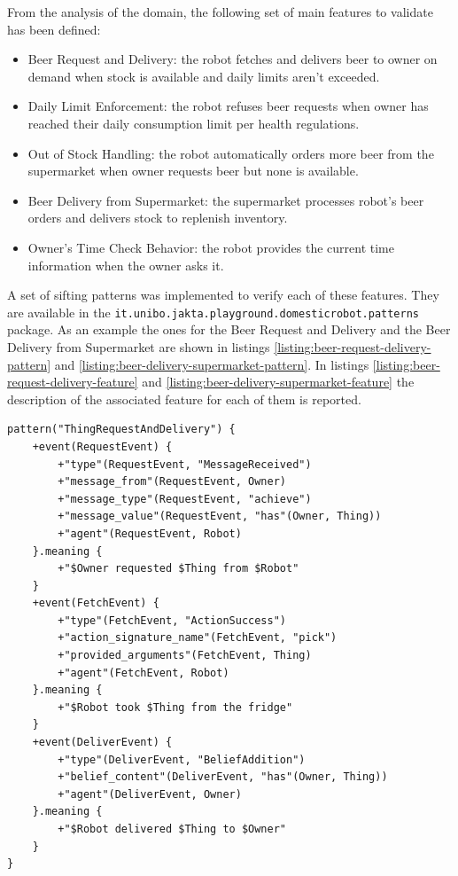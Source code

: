\documentclass{scrartcl}
\begin{document}
From the analysis of the domain, the following set of main features to validate has been defined:

\begin{itemize}
    \item Beer Request and Delivery: the robot fetches and delivers beer to owner on demand when stock is available and daily limits aren't exceeded.
    \item Daily Limit Enforcement: the robot refuses beer requests when owner has reached their daily consumption limit per health regulations.
    \item Out of Stock Handling: the robot automatically orders more beer from the supermarket when owner requests beer but none is available.
    \item Beer Delivery from Supermarket: the supermarket processes robot's beer orders and delivers stock to replenish inventory.
    \item Owner's Time Check Behavior: the robot provides the current time information when the owner asks it.
\end{itemize}

A set of sifting patterns was implemented to verify each of these features. They are available in the \verb|it.unibo.jakta.playground.domesticrobot.patterns| package. As an example the ones for the Beer Request and Delivery and the Beer Delivery from Supermarket are shown in listings \ref{listing:beer-request-delivery-pattern} and \ref{listing:beer-delivery-supermarket-pattern}. In listings \ref{listing:beer-request-delivery-feature} and \ref{listing:beer-delivery-supermarket-feature} the description of the associated feature for each of them is reported.

\begin{listing}
\begin{verbatim}
pattern("ThingRequestAndDelivery") {
    +event(RequestEvent) {
        +"type"(RequestEvent, "MessageReceived")
        +"message_from"(RequestEvent, Owner)
        +"message_type"(RequestEvent, "achieve")
        +"message_value"(RequestEvent, "has"(Owner, Thing))
        +"agent"(RequestEvent, Robot)
    }.meaning {
        +"$Owner requested $Thing from $Robot"
    }
    +event(FetchEvent) {
        +"type"(FetchEvent, "ActionSuccess")
        +"action_signature_name"(FetchEvent, "pick")
        +"provided_arguments"(FetchEvent, Thing)
        +"agent"(FetchEvent, Robot)
    }.meaning {
        +"$Robot took $Thing from the fridge"
    }
    +event(DeliverEvent) {
        +"type"(DeliverEvent, "BeliefAddition")
        +"belief_content"(DeliverEvent, "has"(Owner, Thing))
        +"agent"(DeliverEvent, Owner)
    }.meaning {
        +"$Robot delivered $Thing to $Owner"
    }
}
\end{verbatim}
\caption{The ThingRequestAndDelivery pattern, which is used to verify that the Beer Request and Delivery feature correctly works.}
\label{listing:beer-request-delivery-pattern}
\end{listing}
\end{document}
